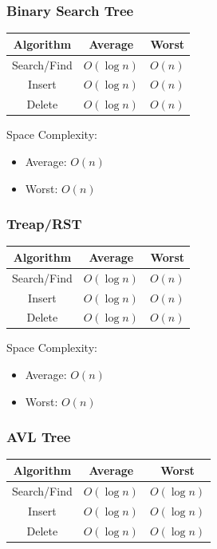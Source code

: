 \documentclass[letterpaper]{article}
\begin{document}
\subsubsection{Binary Search Tree}
\begin{center}
    \begin{tabular}{|c|c|c|}
        \hline 
        \textbf{Algorithm} & \textbf{Average} & \textbf{Worst} \\ 
        \hline 
        Search/Find & $O(\log n)$ & $O(n)$ \\ 
        Insert & $O(\log n)$ & $O(n)$ \\ 
        Delete & $O(\log n)$ & $O(n)$ \\ 
        \hline 
    \end{tabular}
\end{center}

Space Complexity: 
\begin{itemize}
    \item Average: $O(n)$ 
    \item Worst: $O(n)$
\end{itemize}


\subsubsection{Treap/RST}
\begin{center}
    \begin{tabular}{|c|c|c|}
        \hline 
        \textbf{Algorithm} & \textbf{Average} & \textbf{Worst} \\ 
        \hline 
        Search/Find & $O(\log n)$ & $O(n)$ \\ 
        Insert & $O(\log n)$ & $O(n)$ \\ 
        Delete & $O(\log n)$ & $O(n)$ \\ 
        \hline 
    \end{tabular}
\end{center}

Space Complexity: 
\begin{itemize}
    \item Average: $O(n)$ 
    \item Worst: $O(n)$
\end{itemize}


\subsubsection{AVL Tree}
\begin{center}
    \begin{tabular}{|c|c|c|}
        \hline 
        \textbf{Algorithm} & \textbf{Average} & \textbf{Worst} \\ 
        \hline 
        Search/Find & $O(\log n)$ & $O(\log n)$ \\ 
        Insert & $O(\log n)$ & $O(\log n)$ \\ 
        Delete & $O(\log n)$ & $O(\log n)$ \\ 
        \hline 
    \end{tabular}
\end{center}
\end{document}
